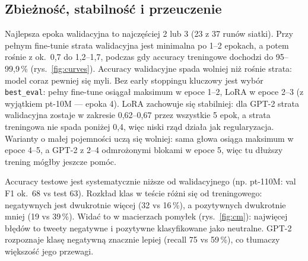 \documentclass[11pt,a4paper]{article}
\begin{document}
\subsection{Zbieżność, stabilność i przeuczenie}
Najlepsza epoka walidacyjna to najczęściej 2 lub 3 (23 z 37 runów siatki). Przy pełnym fine-tunie
strata walidacyjna jest minimalna po 1--2 epokach, a potem rośnie z ok.\ 0,7 do 1,2--1,7, podczas
gdy accuracy treningowe dochodzi do 95--99,9\,\% (rys.~\ref{fig:curves}). Accuracy walidacyjne
spada wolniej niż rośnie strata: model coraz pewniej się myli. Bez early stoppingu kluczowy jest
wybór \texttt{best\_eval}: pełny fine-tune osiągał maksimum w epoce 1--2, LoRA w epoce 2--3
(z wyjątkiem pt-10M --- epoka 4).
LoRA zachowuje się stabilniej: dla GPT-2 strata walidacyjna zostaje w zakresie 0,62--0,67 przez
wszystkie 5 epok, a strata treningowa nie spada poniżej 0,4, więc niski rząd działa jak
regularyzacja. Warianty o małej pojemności uczą się wolniej: sama głowa osiąga maksimum w epoce
4--5, a GPT-2 z 2--4 odmrożonymi blokami w epoce 5, więc tu dłuższy trening mógłby jeszcze pomóc.

Accuracy testowe jest systematycznie niższe od walidacyjnego (np. pt-110M: val F1 ok.\ 68 vs test
63). Rozkład klas w teście różni się od treningowego: negatywnych jest dwukrotnie więcej (32 vs
16\,\%), a pozytywnych dwukrotnie mniej (19 vs 39\,\%). Widać to w macierzach pomyłek
(rys.~\ref{fig:cm}): najwięcej błędów to tweety negatywne i pozytywne klasyfikowane jako neutralne.
GPT-2 rozpoznaje klasę negatywną znacznie lepiej (recall 75 vs 59\,\%), co tłumaczy większość jego
przewagi.
\end{document}
